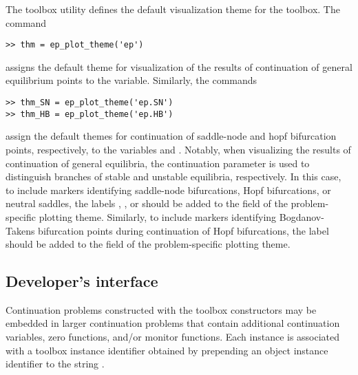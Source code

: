 The  toolbox utility defines the default visualization theme for the  toolbox. The command
\begin{lstlisting}[language=coco-highlight]
>> thm = ep_plot_theme('ep')
\end{lstlisting}
assigns the default theme for visualization of the results of continuation of general equilibrium points to the  variable. Similarly, the commands
\begin{lstlisting}[language=coco-highlight]
>> thm_SN = ep_plot_theme('ep.SN')
>> thm_HB = ep_plot_theme('ep.HB')
\end{lstlisting}
assign the default themes for continuation of saddle-node and hopf bifurcation points, respectively, to the variables  and . Notably, when visualizing the results of continuation of general equilibria, the continuation parameter  is used to distinguish branches of stable and unstable equilibria, respectively. In this case, to include markers identifying saddle-node bifurcations, Hopf bifurcations, or neutral saddles, the labels , , or  should be added to the  field of the problem-specific plotting theme. Similarly, to include markers identifying Bogdanov-Takens bifurcation points during continuation of Hopf bifurcations, the label  should be added to the  field of the problem-specific plotting theme.

\subsection{Developer's interface}
Continuation problems constructed with the  toolbox constructors may be embedded in larger continuation problems that contain additional continuation variables, zero functions, and/or monitor functions. Each  instance is associated with a toolbox instance identifier obtained by prepending an object instance identifier to the string . 

